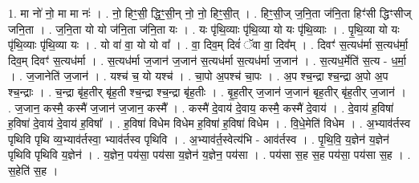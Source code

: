 \documentclass[17pt]{extarticle}
\begin{document}
1. मा नो॑ नो॒ मा मा नः॑ । . नो॒ हिꣳ॒॒सी॒ द्धिꣳ॒॒सी॒न् नो॒ नो॒ हिꣳ॒॒सी॒त् । . हिꣳ॒॒सी॒ज् ज॒नि॒ता ज॑नि॒ता हिꣳ॑सी द्धिꣳसीज् जनि॒ता । . ज॒नि॒ता यो यो ज॑नि॒ता ज॑नि॒ता यः । . यः पृ॑थि॒व्याः पृ॑थि॒व्या यो यः पृ॑थि॒व्याः । . पृ॒थि॒व्या यो यः पृ॑थि॒व्याः पृ॑थि॒व्या यः । . यो वा॑ वा॒ यो यो वा᳚ । . वा॒ दिव॒म् दिवं॑ ॅवा वा॒ दिव᳚म् । . दिवꣳ॑ स॒त्यध॑र्मा स॒त्यध॑र्मा॒ दिव॒म् दिवꣳ॑ स॒त्यध॑र्मा । . स॒त्यध॑र्मा ज॒जान॑ ज॒जान॑ स॒त्यध॑र्मा स॒त्यध॑र्मा ज॒जान॑ । . स॒त्यध॒र्मेति॑ स॒त्य - ध॒र्मा॒ । . ज॒जानेति॑ ज॒जान॑ । . यश्च॑ च॒ यो यश्च॑ । . चा॒पो अ॒पश्च॑ चा॒पः । . अ॒प श्च॒न्द्रा श्च॒न्द्रा अ॒पो अ॒प श्च॒न्द्राः । . च॒न्द्रा बृ॑ह॒तीर् बृ॑ह॒ती श्च॒न्द्रा श्च॒न्द्रा बृ॑ह॒तीः । . बृ॒ह॒तीर् ज॒जान॑ ज॒जान॑ बृह॒तीर् बृ॑ह॒तीर् ज॒जान॑ । . ज॒जान॒ कस्मै॒ कस्मै॑ ज॒जान॑ ज॒जान॒ कस्मै᳚ । . कस्मै॑ दे॒वाय॑ दे॒वाय॒ कस्मै॒ कस्मै॑ दे॒वाय॑ । . दे॒वाय॑ ह॒विषा॑ ह॒विषा॑ दे॒वाय॑ दे॒वाय॑ ह॒विषा᳚ । . ह॒विषा॑ विधेम विधेम ह॒विषा॑ ह॒विषा॑ विधेम । . वि॒धे॒मेति॑ विधेम । . अ॒भ्याव॑र्तस्व पृथिवि पृथि व्य॒भ्याव॑र्तस्वा॒ भ्याव॑र्तस्व पृथिवि । . अ॒भ्याव॑र्त॒स्वेत्य॑भि - आव॑र्तस्व । . पृ॒थि॒वि॒ य॒ज्ञेन॑ य॒ज्ञेन॑ पृथिवि पृथिवि य॒ज्ञेन॑ । . य॒ज्ञेन॒ पय॑सा॒ पय॑सा य॒ज्ञेन॑ य॒ज्ञेन॒ पय॑सा । . पय॑सा स॒ह स॒ह पय॑सा॒ पय॑सा स॒ह । . स॒हेति॑ स॒ह । \newline
\end{document}
